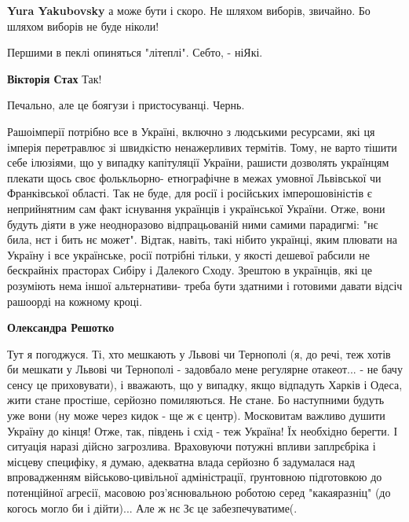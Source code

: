 \begin{itemize}
\begin{itemize}
\textbf{Yura Yakubovsky} а може бути і скоро. Не шляхом виборів, звичайно. Бо шляхом виборів не буде ніколи!
\end{itemize} %

Першими в пеклі опиняться "літеплі". Себто, - ніЯкі.

\textbf{Вікторія Стах} Так!

Печально, але це боягузи і пристосуванці. Чернь.


Рашоімперії потрібно все в Україні, включно з людськими ресурсами, які ця
імперія перетравлює зі швидкістю ненажерливих термітів. Тому, не варто тішити
себе ілюзіями, що у випадку капітуляції України, рашисти дозволять українцям
плекати щось своє фолькльорно- етнографічне в межах умовної Львівської чи
Франківської області. Так не буде, для росії і російських імперошовіністів є
неприйнятним сам факт існування українців і української України. Отже, вони
будуть діяти в уже неодноразово відпрацьованій ними самими парадигмі: "нє била,
нєт і бить нє может". Відтак, навіть, такі нібито українці, яким плювати на
Україну і все українське, росії потрібні тільки, у якості дешевої рабсили не
бескрайніх прасторах Сибіру і Далекого Сходу. Зрештою в українців, які це
розуміють нема іншої альтернативи- треба бути здатними і готовими давати відсіч
рашоорді на кожному кроці.

\begin{itemize} %
\textbf{Олександра Решотко} 

Тут я погоджуся. Ті, хто мешкають у Львові чи Тернополі (я, до речі, теж хотів
би мешкати у Львові чи Тернополі - задовбало мене регулярне отакеот... - не
бачу сенсу це приховувати), і вважають, що у випадку, якщо відпадуть Харків і
Одеса, жити стане простіше, серйозно помиляються. Не стане. Бо наступними
будуть уже вони (ну може через кидок - ще ж є центр). Московитам важливо душити
Україну до кінця! Отже, так, південь і схід - теж Україна! Їх необхідно
берегти. І ситуація наразі дійсно загрозлива. Враховуючи потужні впливи
заплрєбріка і місцеву специфіку, я думаю, адекватна влада серйозно б задумалася
над впровадженням військово-цивільної адміністрації, ґрунтовною підготовкою до
потенційної агресії, масовою роз'яснювальною роботою серед "какаяразніц" (до
когось могло би і дійти)... Але ж нє Зє це забезпечуватиме(.

\end{itemize} %


\end{itemize}

